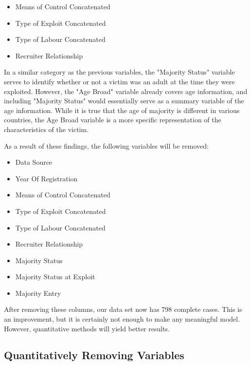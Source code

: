 \documentclass{article} %
\begin{document}
	\begin{multicols}{2}
		\begin{itemize}
			\item Means of Control Concatenated
			\item Type of Exploit Concatenated
			\item Type of Labour Concatenated
			\item Recruiter Relationship
		\end{itemize}
	\end{multicols}
	
	In a similar category as the previous variables, the "Majority Status" variable serves to identify whether or not a victim was an adult at the time they were exploited. However, the "Age Broad" variable already covers age information, and including "Majority Status" would essentially serve as a summary variable of the age information. While it is true that the age of majority is different in various countries, the Age Broad variable is a more specific representation of the characteristics of the victim.
	
	As a result of these findings, the following variables will be removed:
	
	\begin{multicols}{2}
		\begin{itemize}
		\item Data Source
		\item Year Of Registration
		\item Means of Control Concatenated
		\item Type of Exploit Concatenated
		\item Type of Labour Concatenated
		\item Recruiter Relationship
		\item Majority Status
		\item Majority Status at Exploit
		\item Majority Entry
	\end{itemize}
	\end{multicols}
	
	After removing these columns, our data set now has 798 complete cases. This is an improvement, but it is certainly not enough to make any meaningful model. However, quantitative methods will yield better results.

	
	\subsection{Quantitatively Removing Variables}
	
\end{document}
